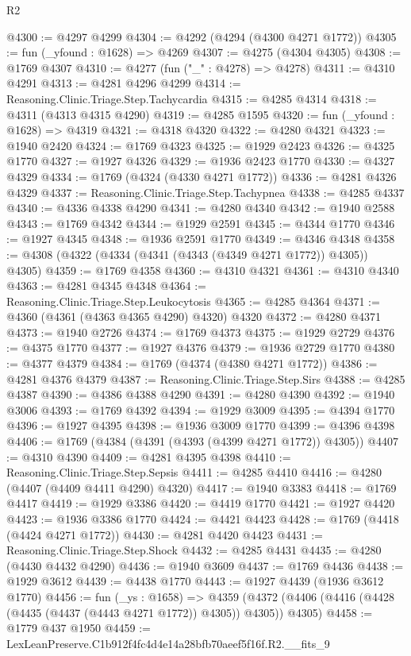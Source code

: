 \begin{lexlean}{R2}
\begin{coremodule}
@4300 := @4297 @4299
@4304 := @4292 (@4294 (@4300 @4271 @1772))
@4305 := fun (_yfound : @1628) => @4269
@4307 := @4275 (@4304 @4305)
@4308 := @1769 @4307
@4310 := @4277 (fun ("_" : @4278) => @4278)
@4311 := @4310 @4291
@4313 := @4281 @4296 @4299
@4314 := Reasoning.Clinic.Triage.Step.Tachycardia
@4315 := @4285 @4314
@4318 := @4311 (@4313 @4315 @4290)
@4319 := @4285 @1595
@4320 := fun (_yfound : @1628) => @4319
@4321 := @4318 @4320
@4322 := @4280 @4321
@4323 := @1940 @2420
@4324 := @1769 @4323
@4325 := @1929 @2423
@4326 := @4325 @1770
@4327 := @1927 @4326
@4329 := @1936 @2423 @1770
@4330 := @4327 @4329
@4334 := @1769 (@4324 (@4330 @4271 @1772))
@4336 := @4281 @4326 @4329
@4337 := Reasoning.Clinic.Triage.Step.Tachypnea
@4338 := @4285 @4337
@4340 := @4336 @4338 @4290
@4341 := @4280 @4340
@4342 := @1940 @2588
@4343 := @1769 @4342
@4344 := @1929 @2591
@4345 := @4344 @1770
@4346 := @1927 @4345
@4348 := @1936 @2591 @1770
@4349 := @4346 @4348
@4358 := @4308 (@4322 (@4334 (@4341 (@4343 (@4349 @4271 @1772)) @4305)) @4305)
@4359 := @1769 @4358
@4360 := @4310 @4321
@4361 := @4310 @4340
@4363 := @4281 @4345 @4348
@4364 := Reasoning.Clinic.Triage.Step.Leukocytosis
@4365 := @4285 @4364
@4371 := @4360 (@4361 (@4363 @4365 @4290) @4320) @4320
@4372 := @4280 @4371
@4373 := @1940 @2726
@4374 := @1769 @4373
@4375 := @1929 @2729
@4376 := @4375 @1770
@4377 := @1927 @4376
@4379 := @1936 @2729 @1770
@4380 := @4377 @4379
@4384 := @1769 (@4374 (@4380 @4271 @1772))
@4386 := @4281 @4376 @4379
@4387 := Reasoning.Clinic.Triage.Step.Sirs
@4388 := @4285 @4387
@4390 := @4386 @4388 @4290
@4391 := @4280 @4390
@4392 := @1940 @3006
@4393 := @1769 @4392
@4394 := @1929 @3009
@4395 := @4394 @1770
@4396 := @1927 @4395
@4398 := @1936 @3009 @1770
@4399 := @4396 @4398
@4406 := @1769 (@4384 (@4391 (@4393 (@4399 @4271 @1772)) @4305))
@4407 := @4310 @4390
@4409 := @4281 @4395 @4398
@4410 := Reasoning.Clinic.Triage.Step.Sepsis
@4411 := @4285 @4410
@4416 := @4280 (@4407 (@4409 @4411 @4290) @4320)
@4417 := @1940 @3383
@4418 := @1769 @4417
@4419 := @1929 @3386
@4420 := @4419 @1770
@4421 := @1927 @4420
@4423 := @1936 @3386 @1770
@4424 := @4421 @4423
@4428 := @1769 (@4418 (@4424 @4271 @1772))
@4430 := @4281 @4420 @4423
@4431 := Reasoning.Clinic.Triage.Step.Shock
@4432 := @4285 @4431
@4435 := @4280 (@4430 @4432 @4290)
@4436 := @1940 @3609
@4437 := @1769 @4436
@4438 := @1929 @3612
@4439 := @4438 @1770
@4443 := @1927 @4439 (@1936 @3612 @1770)
@4456 := fun (_ys : @1658) =>
  @4359 (@4372 (@4406 (@4416 (@4428 (@4435 (@4437 (@4443 @4271 @1772)) @4305)) @4305)) @4305)
@4458 := @1779 @437 @1950
@4459 := LexLeanPreserve.C1b912f4fc4d4e14a28bfb70aeef5f16f.R2.__fits_9

\end{coremodule}
\end{lexlean}
